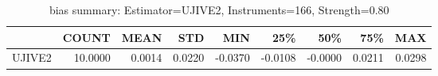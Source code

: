 \begin{table}[ht]
\centering
\caption{bias summary: Estimator=UJIVE2, Instruments=166, Strength=0.80}
\begin{tabular}{lrrrrrrrr}
\toprule
 & COUNT & MEAN & STD & MIN & 25\% & 50\% & 75\% & MAX \\
\midrule
UJIVE2 & 10.0000 & 0.0014 & 0.0220 & -0.0370 & -0.0108 & -0.0000 & 0.0211 & 0.0298 \\
\bottomrule
\end{tabular}
\end{table}
